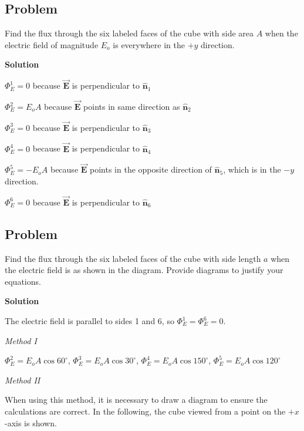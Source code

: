 \documentclass{article}
\newcommand{\bfvec}[1]{\vec{\mathbf{#1}}}
\begin{document}
\newpage
\fi

\subsection{Problem}



Find the flux through the six labeled faces of the cube with side area $A$ when the electric field of magnitude $E_o$ is everywhere in the $+y$ direction.

\ifsolutions
\textbf{Solution}

$\Phi_E^1=0$ because $\bfvec{E}$ is perpendicular to $\hat{\mathbf{n}}_1$

$\Phi_E^2=E_oA$ because $\bfvec{E}$ points in same direction as $\hat{\mathbf{n}}_2$

$\Phi_E^3=0$ because $\bfvec{E}$ is perpendicular to $\hat{\mathbf{n}}_3$

$\Phi_E^4=0$ because $\bfvec{E}$ is perpendicular to $\hat{\mathbf{n}}_4$

$\Phi_E^5=-E_oA$ because $\bfvec{E}$ points in the opposite direction of $\hat{\mathbf{n}}_5$, which is in the $-y$ direction.

$\Phi_E^6=0$ because $\bfvec{E}$ is perpendicular to $\hat{\mathbf{n}}_6$
\else

\newpage
\fi

\subsection{Problem}



Find the flux through the six labeled faces of the cube with side length $a$ when the electric field is as shown in the diagram. Provide diagrams to justify your equations.

\ifsolutions
\textbf{Solution}

The electric field is parallel to sides 1 and 6, so $\Phi_E^1=\Phi_E^6=0$.

\emph{Method I}



$\Phi_E^2=E_oA\cos 60^\circ$, $\Phi_E^3=E_oA\cos 30^\circ$, $\Phi_E^4=E_oA\cos 150^\circ$, $\Phi_E^5=E_oA\cos 120^\circ$

\emph{Method II}

When using this method, it is necessary to draw a diagram to ensure the calculations are correct. In the following, the cube viewed from a point on the $+x$-axis is shown.
\end{document}

